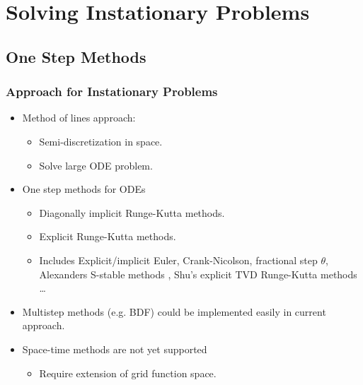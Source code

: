 \section{Solving Instationary Problems}

\subsection{One Step Methods}

\begin{frame}
\frametitle{Approach for Instationary Problems}
\begin{itemize}
\item Method of lines approach:
\begin{itemize}
\item Semi-discretization in space.
\item Solve large ODE problem.
\end{itemize}
\item One step methods for ODEs
\begin{itemize}
\item Diagonally implicit Runge-Kutta methods.
\item Explicit Runge-Kutta methods.
\item Includes Explicit/implicit Euler, Crank-Nicolson, fractional
step $\theta$, Alexanders S-stable methods \cite{alexander:77}, 
Shu's explicit TVD Runge-Kutta methods \cite{shu:88}\ldots
\end{itemize}
\item Multistep methods (e.g. BDF) could be implemented easily in current approach.
\item Space-time methods are not yet supported
\begin{itemize}
\item Require extension of grid function space.
\end{itemize}
\end{itemize}
\end{frame}

